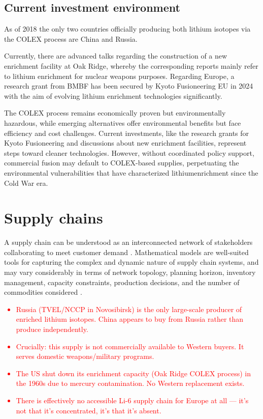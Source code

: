     \subsection{Current investment environment} 
    \label{subsec_investment_environment}
    As of 2018 the only two countries officially producing both lithium isotopes via the COLEX process are China and Russia. \cite{AcostaFlexer2018}

    Currently, there are advanced talks regarding the construction of a new enrichment facility at Oak Ridge, whereby the corresponding reports mainly refer to lithium enrichment for nuclear weapons purposes. \cite{US_LithiumProcessing_2021}
    Regarding Europe, a research grant from BMBF has been secured by Kyoto Fusioneering EU in 2024 with the aim of evolving lithium enrichment technologies significantly. \cite{KyotoFusioneering2024}

    The COLEX process remains economically proven but environmentally hazardous, while emerging alternatives offer environmental benefits but face efficiency and cost challenges. Current investments, like the research grants for Kyoto Fusioneering and discussions about new enrichment facilities, represent steps toward cleaner technologies. However, without coordinated policy support, commercial fusion may default to COLEX-based supplies, perpetuating the environmental vulnerabilities that have characterized lithiumenrichment since the Cold War era.

\section{Supply chains} 
\label{sec_supply_chains_sota}
A supply chain can be understood as an interconnected network of stakeholders collaborating to meet customer demand \cite{farajiamiriMultiobjectiveOptimizationRenewable2023}. Mathematical models are well-suited tools for capturing the complex and dynamic nature of supply chain systems, and may vary considerably in terms of network topology, planning horizon, inventory management, capacity constraints, production decisions, and the number of commodities considered \cite{farajiamiriMultiobjectiveOptimizationRenewable2023}.

\textcolor{red}{
\begin{itemize}
    \item Russia (TVEL/NCCP in Novosibirsk) is the only large-scale producer of enriched lithium isotopes. China appears to buy from Russia rather than produce independently.
    \item Crucially: this supply is not commercially available to Western buyers. It serves domestic weapons/military programs.
    \item The US shut down its enrichment capacity (Oak Ridge COLEX process) in the 1960s due to mercury contamination. No Western replacement exists.
    \item There is effectively no accessible Li-6 supply chain for Europe at all — it's not that it's concentrated, it's that it's absent.
\end{itemize}
}

